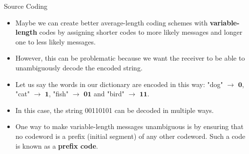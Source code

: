 \begin{vbframe} {Source Coding}
\begin{itemize}
  \end{itemize}
  
\framebreak

\begin{itemize}
  \item Maybe we can create better average-length coding schemes with \textbf{variable-length} codes by assigning shorter codes to more likely messages and longer one to less likely messages.
  \item However, this can be problematic because we want the receiver to be able to unambiguously decode the encoded string.
  \item Let us say the words in our dictionary are encoded in this way: "dog" $\rightarrow$ $\mathbf{0}$, "cat" $\rightarrow$ $\mathbf{1}$, "fish" $\rightarrow$ $\mathbf{01}$ and "bird" $\rightarrow$ $\mathbf{11}$.
  \item In this case, the string 00110101 can be decoded in multiple ways.
  \begin{figure}
    \centering
  \end{figure}
    \item One way to make variable-length messages unambiguous is by ensuring that no codeword is a prefix (initial segment) of any other codeword. Such a code is known as a \textbf{prefix code}.
\end{itemize}

\framebreak


\end{vbframe}
